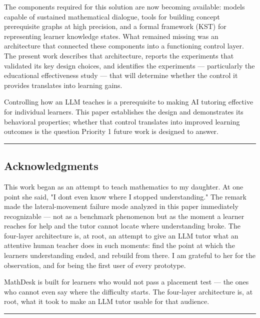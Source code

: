 \documentclass[
]{article}
\begin{document}
The components required for this solution are now becoming available: models capable of sustained mathematical dialogue, tools for building concept prerequisite graphs at high precision, and a formal framework (KST) for representing learner knowledge states. What remained missing was an architecture that connected these components into a functioning control layer. The present work describes that architecture, reports the experiments that validated its key design choices, and identifies the experiments --- particularly the educational effectiveness study --- that will determine whether the control it provides translates into learning gains.

Controlling how an LLM teaches is a prerequisite to making AI tutoring effective for individual learners. This paper establishes the design and demonstrates its behavioral properties; whether that control translates into improved learning outcomes is the question Priority 1 future work is designed to answer.

\begin{center}\rule{0.5\linewidth}{0.5pt}\end{center}

\subsection{Acknowledgments}\label{acknowledgments}

This work began as an attempt to teach mathematics to my daughter. At one point she said, "I don\textquotesingle t even know where I stopped understanding." The remark made the lateral-movement failure mode analyzed in this paper immediately recognizable --- not as a benchmark phenomenon but as the moment a learner reaches for help and the tutor cannot locate where understanding broke. The four-layer architecture is, at root, an attempt to give an LLM tutor what an attentive human teacher does in such moments: find the point at which the learner\textquotesingle s understanding ended, and rebuild from there. I am grateful to her for the observation, and for being the first user of every prototype.

MathDesk is built for learners who would not pass a placement test --- the ones who cannot even say where the difficulty starts. The four-layer architecture is, at root, what it took to make an LLM tutor usable for that audience.

\begin{center}\rule{0.5\linewidth}{0.5pt}\end{center}
\end{document}
